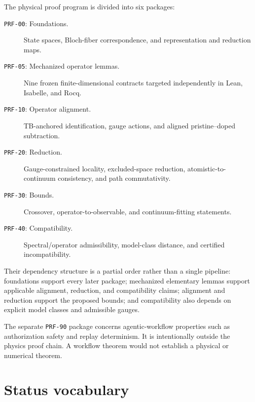 The physical proof program is divided into six packages:

\begin{description}
  \item[\texttt{PRF-00}: Foundations.] State spaces, Bloch-fiber
    correspondence, and representation and reduction maps.
  \item[\texttt{PRF-05}: Mechanized operator lemmas.] Nine frozen
    finite-dimensional contracts targeted independently in Lean, Isabelle, and
    Rocq.
  \item[\texttt{PRF-10}: Operator alignment.] TB-anchored identification,
    gauge actions, and aligned pristine--doped subtraction.
  \item[\texttt{PRF-20}: Reduction.] Gauge-constrained locality,
    excluded-space reduction, atomistic-to-continuum consistency, and path
    commutativity.
  \item[\texttt{PRF-30}: Bounds.] Crossover, operator-to-observable, and
    continuum-fitting statements.
  \item[\texttt{PRF-40}: Compatibility.] Spectral/operator admissibility,
    model-class distance, and certified incompatibility.
\end{description}


Their dependency structure is a partial order rather than a single pipeline:
foundations support every later package; mechanized elementary lemmas support
applicable alignment, reduction, and compatibility claims; alignment and
reduction support the proposed bounds; and compatibility also depends on
explicit model classes and admissible gauges.

The separate \texttt{PRF-90} package concerns agentic-workflow properties such
as authorization safety and replay determinism. It is intentionally outside the
physics proof chain. A workflow theorem would not establish a physical or
numerical theorem.

\section{Status vocabulary}


